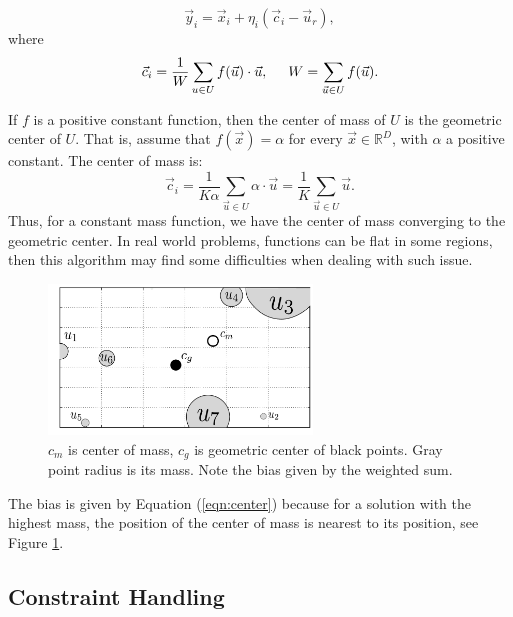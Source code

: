 \documentclass[conference]{IEEEtran}
\begin{document}
\begin{equation}
	\vec{y}_i = \vec{x}_i + \eta _{i} ( \vec{c}_i - \vec{u}_{r} ),
	\label{eqn:vcu}
\end{equation}
%
where 
%
\begin{equation}
	\vec{c}_i = \dfrac{1} {W} \sum_{u \in U} f(\vec{u}) \cdot \vec{u} , 
			\hspace{0.5cm} 
			W = \sum_{ \vec{u} \in U} f(\vec{u}).
	\label{eqn:center}
\end{equation}

If $f$ is a positive constant function, then the center of mass of $U$ is the 
geometric center of  $U$. That is, assume that $f(\vec{x}) = \alpha$ for every 
$\vec{x} \in \mathbb{R}^D$,  with $\alpha$ a positive constant. The 
center of mass is:
%
%
\begin{equation}
	\vec{c}_i = \dfrac{1} {K \alpha} \sum_{ \vec{u} \in U} \alpha \cdot \vec{u} %
			  =  \dfrac{1} {K } \sum_{\vec{u} \in U} \vec{u}.
	\label{eqn:center-geometric}
\end{equation}
%
%
Thus, for a constant mass function, we have the center of mass converging 
to the geometric center. In real world problems, functions can be flat 
in some regions, then this algorithm may find some difficulties  when 
dealing with such issue.

\begin{figure}[!ht]
	\centering
	\includegraphics[width=7cm]{img/masses.pdf}
	\caption{$c_m$ is center of mass, $c_g$ is geometric center of black points. %
	Gray point radius is its mass. Note the bias given by the weighted sum.}
	\label{fig:masses}       %
\end{figure}
%
%
The bias is given by Equation (\ref{eqn:center}) because for a solution 
with the highest mass, the position of the center of mass is nearest to 
its position, see Figure \ref{fig:masses}.
%

\subsection{Constraint Handling} %
\label{sec:constraint_handling}
\end{document}
